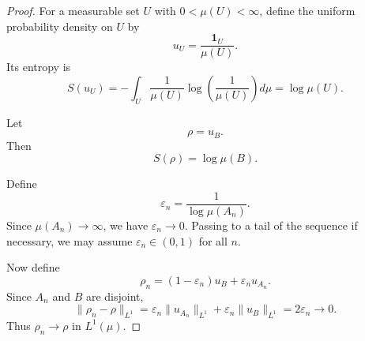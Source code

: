 \documentclass{techbrief}
\begin{document}
\begin{proof}
	For a measurable set $U$ with $0<\mu(U)<\infty$, define the uniform probability density on $U$ by
	\begin{equation}
		u_U=\frac{\mathbf{1}_U}{\mu(U)}.
	\end{equation}
	Its entropy is
	\begin{equation}
		S(u_U)
		=
		-\int_U \frac{1}{\mu(U)}
		\log\left(\frac{1}{\mu(U)}\right)d\mu
		=
		\log \mu(U).
	\end{equation}
	
	Let
	\begin{equation}
		\rho=u_B.
	\end{equation}
	Then
	\begin{equation}
		S(\rho)=\log\mu(B).
	\end{equation}
	
	Define
	\begin{equation}
		\varepsilon_n=\frac{1}{\log\mu(A_n)}.
	\end{equation}
	Since $\mu(A_n)\to\infty$, we have $\varepsilon_n\to0$. Passing to a tail of the sequence if necessary, we may assume $\varepsilon_n\in(0,1)$ for all $n$.
	
	Now define
	\begin{equation}
		\rho_n
		=
		(1-\varepsilon_n)u_B
		+
		\varepsilon_n u_{A_n}.
	\end{equation}
	Since $A_n$ and $B$ are disjoint,
	\begin{equation}
		\|\rho_n-\rho\|_{L^1}
		=
		\varepsilon_n\|u_{A_n}\|_{L^1}
		+
		\varepsilon_n\|u_B\|_{L^1}
		=
		2\varepsilon_n
		\to0.
	\end{equation}
	Thus $\rho_n\to\rho$ in $L^1(\mu)$.
	

\end{proof}
\end{document}
